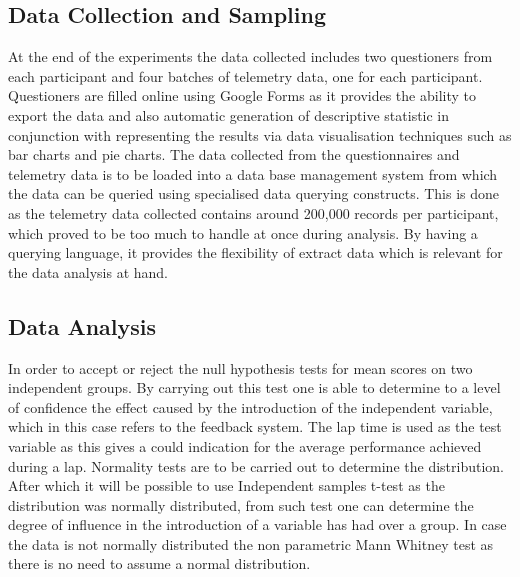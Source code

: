 \subsection{Data Collection and Sampling}
At the end of the experiments the data collected includes two questioners from each participant and four batches of telemetry data, one for each participant. Questioners are filled online using Google Forms as it provides the ability to export the data and also automatic generation of descriptive statistic in conjunction with representing the results via data visualisation techniques such as bar charts and pie charts. The data collected from the questionnaires and telemetry data is to be loaded into a data base management system from which the data can be queried using specialised data querying constructs. This is done as the telemetry data collected contains around 200,000 records per participant, which proved to be too much to handle at once during analysis. By having a querying language, it provides the flexibility of extract data which is relevant for the data analysis at hand.

\subsection{Data Analysis}
In order to accept or reject the null hypothesis tests for mean scores on two independent groups. By carrying out this test one is able to determine to a level of confidence the effect caused by the introduction of the independent variable, which in this case refers to the feedback system. The lap time is used as the test variable as this gives a could indication for the average performance achieved during a lap. Normality tests are to be carried out to determine the distribution. After which it will be possible to use Independent samples t-test\cite{siegel1956nonparametric} as 
the distribution was normally distributed, from such test one can determine the degree of influence in the introduction of a variable has had over a group. In case the data is not normally distributed the non parametric Mann Whitney test as there is no need to assume a normal distribution.